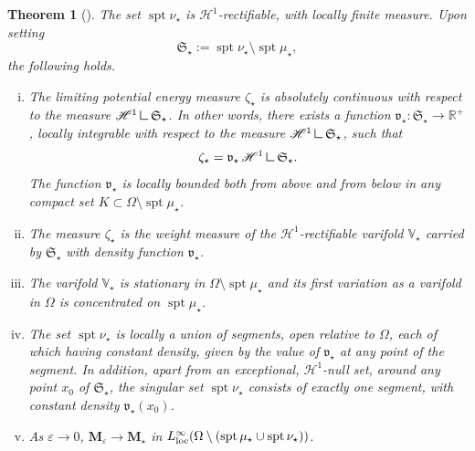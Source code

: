 \documentclass[a4paper, 11pt, twoside, leqno]{article}
\newtheorem{theorem}{Theorem}           %
\theoremstyle{definition}              %
\theoremstyle{remark}                  %
\DeclareMathOperator{\spt}{spt}                                     %
\newcommand{\R}{\mathbb{R}}
\newcommand{\M}{\mathbf{M}}
\renewcommand{\H}{\mathscr{H}}
\newcommand{\eps}{\varepsilon}
\newcommand{\mres}{\mathbin{\vrule height 1.6ex depth 0pt width
0.13ex\vrule height 0.13ex depth 0pt width 1.3ex}}
\begin{document}
\begin{theorem}[{\cite[Theorem~B]{CDS2}}]\label{thm:B-CDS}
	The set $\spt\nu_\star$ is $\H^1$-rectifiable, with locally 
	finite measure. Upon setting 
	\begin{equation}\label{eq:S*}
		\mathfrak{S}_\star := \spt\nu_\star \setminus \spt\mu_\star,
	\end{equation}
	the following holds.
	\begin{enumerate}[(i)] 
	\item\label{item:density} 
	The limiting potential energy measure $\zeta_\star$ is absolutely 
	continuous with respect to the measure $\H^1 \mres \mathfrak{S}_\star$. 
	In other words, there exists a function $\mathfrak{v}_\star : \mathfrak{S}_\star \to \R^+$, 
	locally integrable with respect to the measure $\H^1 \mres \mathfrak{S}_\star$, 
	such that
	\[
		\zeta_\star = \mathfrak{v}_\star \,\H^1 \mres \mathfrak{S}_\star.
	\] 
	The function $\mathfrak{v}_\star$ is locally bounded both from above and 
	from below in any compact set $K \subset \Omega\setminus\spt\mu_\star$.
	\item\label{item:zeta*-weight-measure} The measure $\zeta_\star$ is the weight measure of the $\H^1$-rectifiable varifold 
	$\mathbb{V}_\star$ carried by $\mathfrak{S}_\star$ with density function $\mathfrak{v}_\star$. 
	\item\label{item:balance-law} The varifold $\mathbb{V}_\star$ is stationary in $\Omega \setminus \spt\mu_\star$ and 
	its first variation as a varifold in $\Omega$ is concentrated on $\spt\mu_\star$.
	\item\label{item:segments} The set $\spt\nu_\star$ is locally a union of segments, open relative to $\Omega$, 
	each of which having constant density, given by the value of $\mathfrak{v}_\star$ at any 
	point of the segment. In addition, apart from an exceptional, $\H^1$-null set, around any point $x_0$ of 
	$\mathfrak{S}_\star$, the singular set $\spt\nu_\star$ consists of exactly one segment, 
	with constant density $\mathfrak{v}_\star(x_0)$.
	\item\label{item:unif-conv-M} As $\eps \to 0$, $\M_\eps \to \M_\star$ in $L^\infty_{\rm loc}(\Omega \setminus (\spt\mu_\star \cup \spt\nu_\star))$.
	\end{enumerate}
\end{theorem}
%
\end{document}

